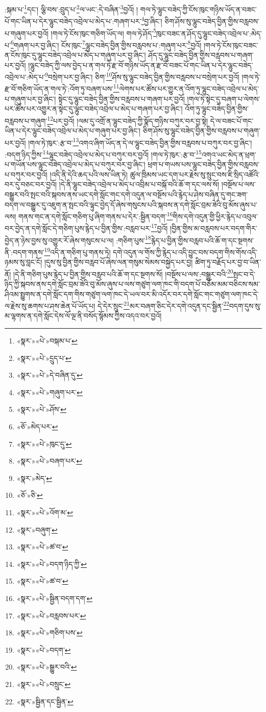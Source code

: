 :སྐམ་པ་\footnote{«སྣར་»«པེ་»བསྐམ་པ་}དང་། ལྕི་བས་:བྲུད་པ་\footnote{«སྣར་»«པེ་»དྲུད་པ་}ལ་ཡང་:དེ་བཞིན་\footnote{«སྣར་»«པེ་»དེ་བཞིན་དུ་}བྱའོ། །
གལ་ཏེ་ལྷུང་བཟེད་ཀྱི་ངོས་ཁུང་གཉིས་ཡོད་ན་བཟང་པོ་གང་ཡིན་པ་དེར་ལྷུང་བཟེད་འབྲེལ་པ་མེད་པ་:གཞག་པར་\footnote{«སྣར་»«པེ་»གཞུག་པར་}བྱ་ཞིང་། ཅིག་ཤོས་སུ་ལྷུང་བཟེད་བྱིན་གྱིས་བརླབས་པ་གཞུག་པར་བྱའོ། །གལ་ཏེ་ངོས་ཁུང་གཅིག་ཡོད་ལ། གལ་ཏེ་ཤོད་\footnote{«སྣར་»«པེ་»ཤོས་}ཁུང་བཟང་ན་ཤོད་དུ་ལྷུང་བཟེད་འབྲེལ་པ་:མེད་པ་\footnote{«ཅོ་»མེད་པར་}གཞག་པར་བྱ་ཞིང་། ངོས་ཁུང་\footnote{«སྣར་»«པེ་»ཁུང་དུ་}ལྷུང་བཟེད་བྱིན་གྱིས་བརླབས་པ་:གཞུག་པར་\footnote{«སྣར་»«པེ་»བཞག་པར་}བྱའོ། །གལ་ཏེ་ངོས་ཁུང་བཟང་ན་ངོས་ཁུང་དུ་ལྷུང་བཟེད་འབྲེལ་པ་མེད་པ་གཞུག་པར་བྱ་ཞིང་། ཤོད་དུ་ལྷུང་བཟེད་བྱིན་གྱིས་བརླབས་པ་གཞག་པར་བྱའོ། །ལྷུང་བཟེད་ཀྱི་ལས་བྱེད་པ་ན་གལ་ཏེ་རྫ་བོ་གཉིས་ཡོད་ན་རྫ་བོ་བཟང་པོ་གང་ཡིན་པ་དེར་ལྷུང་བཟེད་འབྲེལ་པ་:མེད་པ་\footnote{«སྣར་»མེད་}བསྲེག་པར་བྱ་ཞིང་། ཅིག་\footnote{«ཅོ་»ཅི་}ཤོས་སུ་ལྷུང་བཟེད་བྱིན་གྱིས་བརླབས་པ་བསྲེག་པར་བྱའོ། །གལ་ཏེ་རྫ་བོ་གཅིག་ཡོད་ན་གལ་ཏེ་:འོག་ཏུ་བཞག་པས་\footnote{«སྣར་»«པེ་»འོག་མ་}ལེགས་པར་ཚོས་པར་གྱུར་ན་འོག་ཏུ་ལྷུང་བཟེད་འབྲེལ་པ་མེད་པ་གཞུག་པར་བྱ་ཞིང་། སྟེང་དུ་ལྷུང་བཟེད་བྱིན་གྱིས་བརླབས་པ་གཞག་པར་བྱའོ། །གལ་ཏེ་སྟེང་དུ་བཞག་པ་ལེགས་པར་ཚོས་པར་འགྱུར་ན་སྟེང་དུ་ལྷུང་བཟེད་འབྲེལ་པ་མེད་པ་གཞག་པར་བྱ་ཞིང་། འོག་ཏུ་ལྷུང་བཟེད་བྱིན་གྱིས་བརླབས་པ་གཞུག་\footnote{«སྣར་»བཞུག་}པར་བྱའོ། །ལམ་དུ་འགྲོ་ན་ལྷུང་བཟེད་ཀྱི་སྣོད་གཉིས་བཀུར་བར་བྱ་སྟེ། དེ་ལ་བཟང་པོ་གང་ཡིན་པ་དེར་ལྷུང་བཟེད་འབྲེལ་པ་མེད་པ་གཞུག་པར་བྱ་ཞིང་། ཅིག་ཤོས་སུ་ལྷུང་བཟེད་བྱིན་གྱིས་བརླབས་པ་གཞུག་པར་བྱའོ། །གལ་ཏེ་ཁུར་:རྩ་བ་\footnote{«སྣར་»«པེ་»ཚ་བ་}འགའ་ཞིག་ཡོད་ན་དེ་ལ་ལྷུང་བཟེད་བྱིན་གྱིས་བརླབས་པ་བཀུར་བར་བྱ་ཞིང་། :བདག་ཉིད་ཀྱིས་\footnote{«སྣར་»«པེ་»བདག་ཉིད་ཀྱི་}ལྷུང་བཟེད་འབྲེལ་པ་མེད་པ་བཀུར་བར་བྱའོ། །གལ་ཏེ་ཁུར་:རྩ་བ་\footnote{«སྣར་»«པེ་»ཚ་བ་}འགའ་ཡང་མེད་ན་ཕྲག་པ་གཡོན་པས་ལྷུང་བཟེད་འབྲེལ་པ་མེད་པ་བཀུར་བར་བྱ་ཞིང་། ཕྲག་པ་གཡས་པས་ལྷུང་བཟེད་བྱིན་གྱིས་བརླབས་པ་བཀུར་བར་བྱའོ། །འདི་ནི་དེའི་ཆད་པའི་ལས་ཡིན་ཏེ། ཚུལ་ཁྲིམས་ཡང་དག་པར་རྗེས་སུ་སྲུང་བས་ཇི་སྲིད་འཚོའི་བར་དུ་བཅང་བར་བྱའོ། །དེ་ནི་ལྷུང་བཟེད་འབྲེལ་པ་མེད་པ་འབྲིམ་པ་བསྐོ་བའི་ཆོ་ག་དང་ལས་སོ། །བསྔོས་པ་ལས་བསྒྱུར་བའི་སྤང་བའི་སྐབས་ནས་ཡང་དགེ་སློང་གང་དགེ་འདུན་ལ་བསྔོས་པའི་རྙེད་པ་ཤེས་བཞིན་དུ་གང་ཟག་བདག་ལ་བསྒྱུར་དུ་འཇུག་ན་སྤང་བའི་ལྟུང་བྱེད་དོ་ཞེས་གསུངས་པའི་སྐབས་ན་དགེ་སློང་བྲམ་ཟེའི་བུ་མོས་ཞུས་པ་ལས། གནས་གང་ན་དགེ་སློང་གཅིག་པུ་ཞིག་གནས་པ་དེར་:སྦྱིན་བདག་\footnote{«སྣར་»«པེ་»སྦྱིན་བདག་དག་}གིས་དགེ་འདུན་གྱི་ཕྱིར་རྙེད་པ་འབུལ་བར་བྱེད་ན་དགེ་སློང་དེ་གཅིག་པུས་རྙེད་པ་བྱིན་གྱིས་:བརླབ་པར་\footnote{«སྣར་»«པེ་»བརླབས་པར་}བྱའོ། །བྱིན་གྱིས་མ་བརླབས་པར་བདག་གིར་བྱེད་ན་ཉེས་བྱས་སུ་འགྱུར་རོ་ཞེས་གསུངས་པ་ལ། :གཅིག་པུས་\footnote{«སྣར་»«པེ་»གཅིག་པས་}རྙེད་པ་བྱིན་གྱིས་བརླབ་པའི་ཆོ་ག་དང་སྔགས་ནི་:བདག་གནས་\footnote{«སྣར་»«པེ་»བདག་}འདི་ན་གཅིག་པུ་གནས་ཏེ། དགེ་འདུན་ལ་གོས་ཀྱི་རྙེད་པ་འདི་བྱུང་བས་བདག་གིས་གོས་འདི་ཉམས་སུ་བླང་ངོ། །དུས་སུ་བྱིན་གྱིས་བརླབ་པོ་ཞེས་ལན་གསུམ་སེམས་བསྐྱེད་པར་བྱ། ཚིག་ཏུ་བརྗོད་པར་བྱ་བ་ཡིན་ནོ། །དེ་ནི་གཅིག་པུས་རྙེད་པ་བྱིན་གྱིས་བརླབ་པའི་ཆོ་ག་དང་སྔགས་སོ། །བསྔོས་པ་ལས་:བསྒྱུར་བའི་\footnote{«སྣར་»«པེ་»སྒྱུར་བའི་}སྤང་བ་དེ་ཉིད་ཀྱི་སྐབས་ནས་དགེ་སློང་བྲམ་ཟེའི་བུ་མོས་ཞུས་པ་ལས་གཙུག་ལག་ཁང་གི་བདག་པོ་བཅོམ་མམ་བཅིངས་སམ་ཤིའམ་སྤྱུགས་ན་དགེ་སློང་དག་གིས་གཙུག་ལག་ཁང་དེ་ཡལ་བར་མི་འདོར་བར་དགེ་སློང་གང་གཙུག་ལག་ཁང་དེ་ལ་རྗེས་སུ་ཆགས་པ་ཤས་ཆེན་པོ་ཡོད་པ། དེ་དེར་སྲུང་\footnote{«སྣར་»«པེ་»བསྲུང་}མར་བཞག་ཅིང་དེར་དགེ་འདུན་དང་སྦྱིན་\footnote{«སྣར་»སྦྱིན་དང་སྦྱིན་}བདག་དུས་སུ་མ་ལྷགས་ན་དགེ་སློང་དེས་ལོ་ལྔ་ནི་བསོད་སྙོམས་ཀྱིས་འདའ་བར་བྱའོ། 